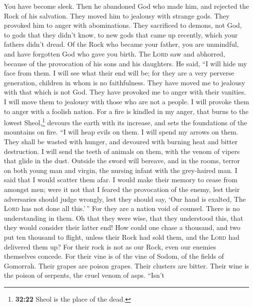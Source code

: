 You have become sleek. Then he abandoned God who made him, and rejected
the Rock of his salvation.  They moved him to jealousy
with strange gods. They provoked him to anger with abominations.
 They sacrificed to demons, not God, to gods that they
didn't know, to new gods that came up recently, which your fathers
didn't dread.  Of the Rock who became your father, you
are unmindful, and have forgotten God who gave you birth.
 The \textsc{Lord} saw and abhorred, because of the
provocation of his sons and his daughters.  He said, ``I
will hide my face from them. I will see what their end will be; for they
are a very perverse generation, children in whom is no faithfulness.
 They have moved me to jealousy with that which is not
God. They have provoked me to anger with their vanities. I will move
them to jealousy with those who are not a people. I will provoke them to
anger with a foolish nation.  For a fire is kindled in my
anger, that burns to the lowest Sheol,\footnote{\textbf{32:22} Sheol is
  the place of the dead.} devours the earth with its increase, and sets
the foundations of the mountains on fire.  ``I will heap
evils on them. I will spend my arrows on them.  They
shall be wasted with hunger, and devoured with burning heat and bitter
destruction. I will send the teeth of animals on them, with the venom of
vipers that glide in the dust.  Outside the sword will
bereave, and in the rooms, terror on both young man and virgin, the
nursing infant with the grey-haired man.  I said that I
would scatter them afar. I would make their memory to cease from amongst
men;  were it not that I feared the provocation of the
enemy, lest their adversaries should judge wrongly, lest they should
say, `Our hand is exalted, The \textsc{Lord} has not done all this.'\,''
 For they are a nation void of counsel. There is no
understanding in them.  Oh that they were wise, that they
understood this, that they would consider their latter end!
 How could one chase a thousand, and two put ten thousand
to flight, unless their Rock had sold them, and the \textsc{Lord} had
delivered them up?  For their rock is not as our Rock,
even our enemies themselves concede.  For their vine is
of the vine of Sodom, of the fields of Gomorrah. Their grapes are poison
grapes. Their clusters are bitter.  Their wine is the
poison of serpents, the cruel venom of asps.  ``Isn't
